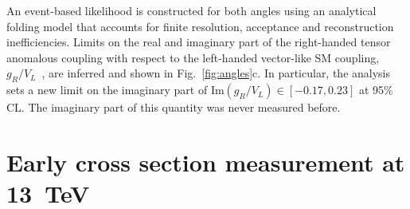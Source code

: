 \documentclass{PoS}
\begin{document}
An event-based likelihood is constructed for both angles using an analytical folding model that accounts for finite resolution, acceptance and reconstruction inefficiencies. Limits on the real and imaginary part of the right-handed tensor anomalous coupling with respect to the left-handed vector-like SM coupling, $g_{R}/V_{L}$~\cite{minimal-anom-set}, are inferred and shown in Fig.~\ref{fig:angles}c. In particular, the analysis sets a new limit on the imaginary part of $\mathrm{Im}(g_{R}/V_{L})\in[-0.17,0.23]$ at 95\% CL. The imaginary part of this quantity was never measured before.


\section{Early cross section measurement at 13~TeV}
\end{document}
